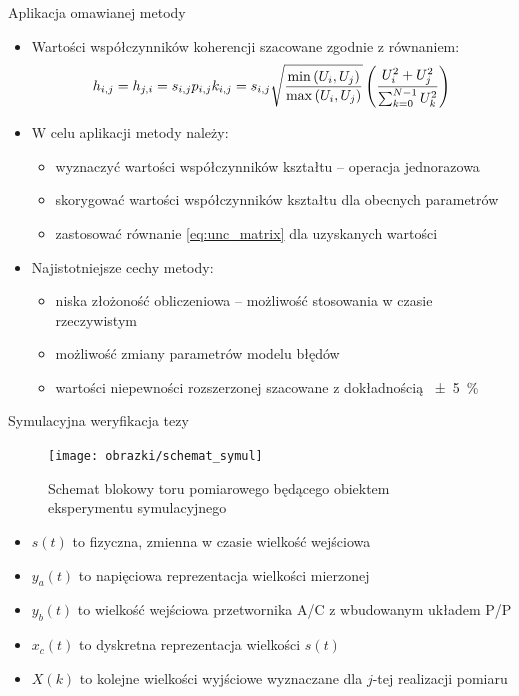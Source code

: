 \documentclass[12pt, polish, aspectratio = 169]{beamer}
\begin{document}
\begin{frame}{Aplikacja omawianej metody}
\begin{itemize}
\item Wartości współczynników koherencji szacowane zgodnie z równaniem:
\begin{equation}
h_{i,j} = h_{j,i} = s_{i,j} p_{i,j} k_{i,j} = s_{i,j} \sqrt{\frac{\min \left(U_{i}, U_{j}\right)}{\max \left(U_{i}, U_{j}\right)}} \left( \frac{U_{i}^{2} + U_{j}^{2}}{\sum _{k = 0} ^{N-1} U_{k}^{2}} \right) \label{eq:unc_coher}
\end{equation}
\item W celu aplikacji metody należy:
	\begin{itemize}
	\item wyznaczyć wartości współczynników kształtu -- operacja jednorazowa
	\item skorygować wartości współczynników kształtu dla obecnych parametrów
	\item zastosować równanie \eqref{eq:unc_matrix} dla uzyskanych wartości
	\end{itemize}
\item Najistotniejsze cechy metody:
	\begin{itemize}
	\item niska złożoność obliczeniowa -- możliwość stosowania w czasie rzeczywistym
	\item możliwość zmiany parametrów modelu błędów
	\item wartości niepewności rozszerzonej szacowane z dokładnością \qty{\pm 5}{\percent}
	\end{itemize}
\end{itemize}
\end{frame}


\begin{frame}{Symulacyjna weryfikacja tezy}
\begin{figure}
\texttt{[image: obrazki/schemat\_symul]}
\caption{Schemat blokowy toru pomiarowego będącego obiektem eksperymentu symulacyjnego}
\label{fig:chain_symul}
\end{figure}
\begin{itemize}
\item $s(t)$ to fizyczna, zmienna w czasie wielkość wejściowa
\item $y_{a}(t)$ to napięciowa reprezentacja wielkości mierzonej
\item $y_{b}(t)$ to wielkość wejściowa przetwornika A/C z wbudowanym układem P/P
\item $x_{c}(t)$ to dyskretna reprezentacja wielkości $s(t)$
\item $X(k)$ to kolejne wielkości wyjściowe wyznaczane dla $j$-tej realizacji pomiaru
\end{itemize}
\end{frame}
\end{document}
